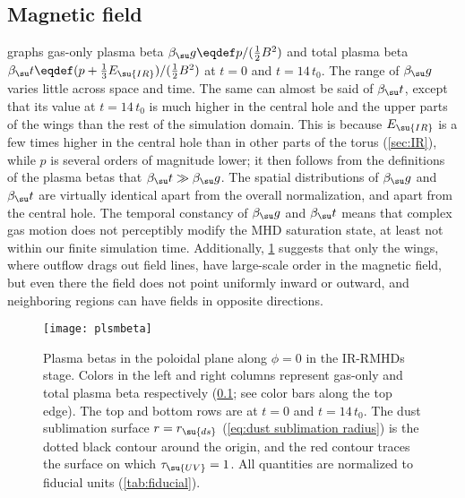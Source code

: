 \documentclass[twocolumn]{article}
\newcommand*\irrmhd{\ac{IR}\protect\nobreakdash-\acp{RMHD}}
\begin{document}
\subsection{Magnetic field}
\label{sec:magnetic field}

 graphs gas-only plasma beta $\beta_\su g\eqdef
p/(\tfrac12B^2)$ and total plasma beta $\beta_\su
t\eqdef(p+\frac13E_\su{IR})/(\tfrac12B^2)$ at $t=0$ and $t=14\,t_0$. The range
of $\beta_\su g$ varies little across space and time. The same can almost be
said of $\beta_\su t$, except that its value at $t=14\,t_0$ is much higher in
the central hole and the upper parts of the wings than the rest of the
simulation domain. This is because $E_\su{IR}$ is a few times higher in the
central hole than in other parts of the torus (\cref{sec:IR}), while $p$ is
several orders of magnitude lower; it then follows from the definitions of the
plasma betas that $\beta_\su t\gg\beta_\su g$. The spatial distributions of
$\beta_\su g$ and $\beta_\su t$ are virtually identical apart from the overall
normalization, and apart from the central hole. The temporal constancy of
$\beta_\su g$ and $\beta_\su t$ means that complex gas motion does not
perceptibly modify the \ac{MHD} saturation state, at least not within our
finite simulation time. Additionally, \cref{fig:plasma beta} suggests that only
the wings, where outflow drags out field lines, have large-scale order in the
magnetic field, but even there the field does not point uniformly inward or
outward, and neighboring regions can have fields in opposite directions.

\begin{figure*}
\texttt{[image: plsmbeta]}
\caption{Plasma betas in the poloidal plane along $\phi=0$ in the \irrmhd{}
stage. Colors in the left and right columns represent gas-only and total plasma
beta respectively (\cref{sec:magnetic field}; see color bars along the top
edge). The top and bottom rows are at $t=0$ and $t=14\,t_0$. The dust
sublimation surface $r=r_\su{ds}$ (\cref{eq:dust sublimation radius}) is the
dotted black contour around the origin, and the red contour traces the surface
on which $\tau_\su{UV}=1$. All quantities are normalized to fiducial units
(\cref{tab:fiducial}).}
\label{fig:plasma beta}
\end{figure*}
\end{document}
